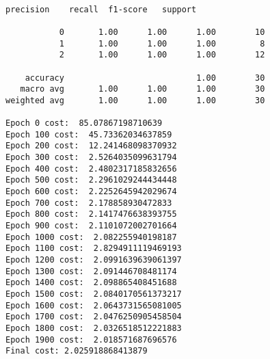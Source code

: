 \documentclass[11pt]{article}
\begin{document}
    \begin{center}
    \end{center}
    { \hspace*{\fill} \\}
    
    \begin{Verbatim}[commandchars=\\\{\}]
              precision    recall  f1-score   support

           0       1.00      1.00      1.00        10
           1       1.00      1.00      1.00         8
           2       1.00      1.00      1.00        12

    accuracy                           1.00        30
   macro avg       1.00      1.00      1.00        30
weighted avg       1.00      1.00      1.00        30

Epoch 0 cost:  85.07867198710639
Epoch 100 cost:  45.73362034637859
Epoch 200 cost:  12.241468098370932
Epoch 300 cost:  2.5264035099631794
Epoch 400 cost:  2.4802317185832656
Epoch 500 cost:  2.2961029244434448
Epoch 600 cost:  2.2252645942029674
Epoch 700 cost:  2.178858930472833
Epoch 800 cost:  2.1417476638393755
Epoch 900 cost:  2.1101072002701664
Epoch 1000 cost:  2.082255940198187
Epoch 1100 cost:  2.8294911119469193
Epoch 1200 cost:  2.0991639639061397
Epoch 1300 cost:  2.091446708481174
Epoch 1400 cost:  2.098865408451688
Epoch 1500 cost:  2.0840170561373217
Epoch 1600 cost:  2.0643731565081005
Epoch 1700 cost:  2.0476250905458504
Epoch 1800 cost:  2.0326518512221883
Epoch 1900 cost:  2.018571687696576
Final cost: 2.025918868413879

    \end{Verbatim}

    \begin{center}
    \end{center}
    { \hspace*{\fill} \\}
    
\end{document}
